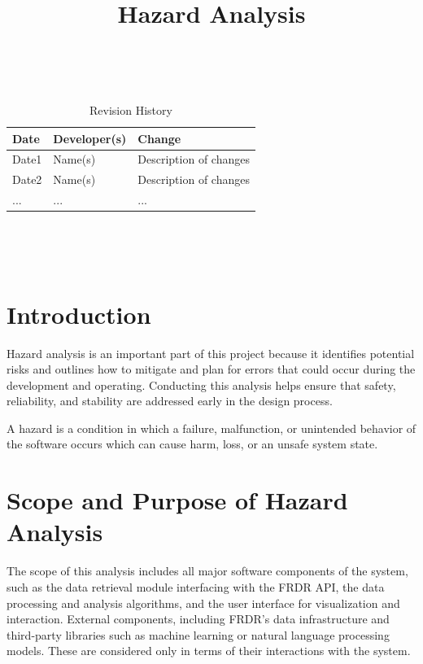 \documentclass{article}
\title{Hazard Analysis\\\progname}
\author{\authname}
\date{}
\begin{document}
\maketitle
\thispagestyle{empty}

~\newpage


\begin{table}[hp]
\caption{Revision History} \label{TblRevisionHistory}
\begin{tabularx}{\textwidth}{llX}
\toprule
\textbf{Date} & \textbf{Developer(s)} & \textbf{Change}\\
\midrule
Date1 & Name(s) & Description of changes\\
Date2 & Name(s) & Description of changes\\
... & ... & ...\\
\bottomrule
\end{tabularx}
\end{table}

~\newpage

\tableofcontents

~\newpage



\section{Introduction}

Hazard analysis is an important part of this project because it identifies potential risks and outlines how to mitigate and plan for errors that could occur during the development and operating. Conducting this analysis helps ensure that safety, reliability, and stability are addressed early in the design process.

A hazard is a condition in which a failure, malfunction, or unintended behavior of the software occurs which can cause harm, loss, or an unsafe system state.

\section{Scope and Purpose of Hazard Analysis}

The scope of this analysis includes all major software components of the system, such as the data retrieval module interfacing with the FRDR API, the data processing and analysis algorithms, and the user interface for visualization and interaction. External components, including FRDR’s data infrastructure and third-party libraries such as machine learning or natural language processing models. These are considered only in terms of their interactions with the system.
\end{document}

